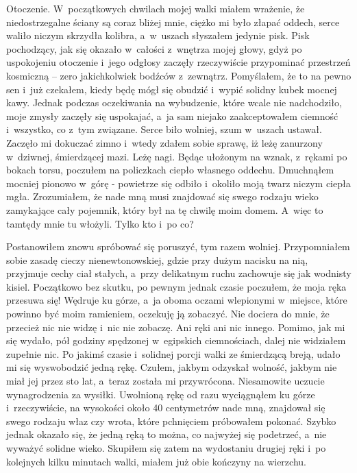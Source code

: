 Otoczenie. W~początkowych chwilach mojej walki miałem wrażenie, że niedostrzegalne ściany są coraz bliżej mnie, ciężko mi było złapać oddech, serce waliło niczym skrzydła kolibra, a~w~uszach słyszałem jedynie pisk. Pisk pochodzący, jak się okazało w~całości z~wnętrza mojej głowy, gdyż po uspokojeniu otoczenie i~jego odgłosy zaczęły rzeczywiście przypominać przestrzeń kosmiczną -- zero jakichkolwiek bodźców z~zewnątrz. Pomyślałem, że to na pewno sen i~już czekałem, kiedy będę mógł się obudzić i~wypić solidny kubek mocnej kawy. Jednak podczas oczekiwania na wybudzenie, które wcale nie nadchodziło, moje zmysły zaczęły się uspokajać, a~ja sam niejako zaakceptowałem ciemność i~wszystko, co z~tym związane. Serce biło wolniej, szum w~uszach ustawał. Zaczęło mi dokuczać zimno i~wtedy zdałem sobie sprawę, iż leżę zanurzony w~dziwnej, śmierdzącej mazi. Leżę nagi. Będąc ułożonym na wznak, z~rękami po bokach torsu, poczułem na policzkach ciepło własnego oddechu. Dmuchnąłem mocniej pionowo w~górę - powietrze się odbiło i~okoliło moją twarz niczym ciepła mgła. Zrozumiałem, że nade mną musi znajdować się swego rodzaju wieko zamykające cały pojemnik, który był na tę chwilę moim domem. A~więc to tamtędy mnie tu włożyli. Tylko kto i~po co? 

Postanowiłem znowu spróbować się poruszyć, tym razem wolniej. Przypomniałem sobie zasadę cieczy nienewtonowskiej, gdzie przy dużym nacisku na nią, przyjmuje cechy ciał stałych, a~przy delikatnym ruchu zachowuje się jak wodnisty kisiel. Początkowo bez skutku, po pewnym jednak czasie poczułem, że moja ręka przesuwa się! Wędruje ku górze, a~ja oboma oczami wlepionymi w~miejsce, które powinno być moim ramieniem, oczekuję ją zobaczyć. Nie dociera do mnie, że przecież nic nie widzę i~nic nie zobaczę. Ani ręki ani nic innego. Pomimo, jak mi się wydało, pół godziny spędzonej w~egipskich ciemnościach, dalej nie widziałem zupełnie nic. Po jakimś czasie i~solidnej porcji walki ze śmierdzącą breją, udało mi się wyswobodzić jedną rękę. Czułem, jakbym odzyskał wolność, jakbym nie miał jej przez sto lat, a~teraz została mi przywrócona. Niesamowite uczucie wynagrodzenia za wysiłki. Uwolnioną rękę od razu wyciągnąłem ku górze i~rzeczywiście, na wysokości około 40 centymetrów nade mną, znajdował się swego rodzaju właz czy wrota, które pchnięciem próbowałem pokonać. Szybko jednak okazało się, że jedną ręką to można, co najwyżej się podetrzeć, a~nie wyważyć solidne wieko. Skupiłem się zatem na wydostaniu drugiej ręki i~po kolejnych kilku minutach walki, miałem już obie kończyny na wierzchu. 

